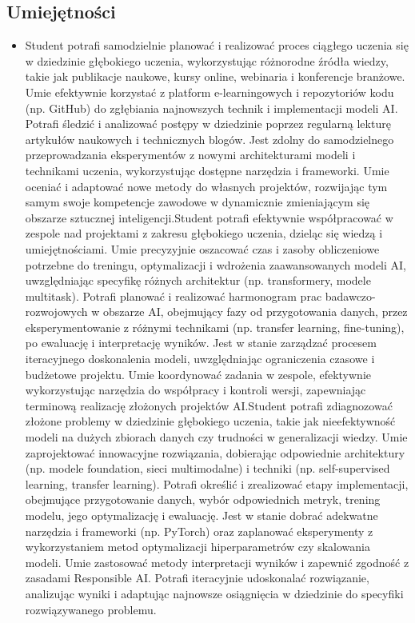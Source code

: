 \documentclass[12pt, a4paper]{article}
\begin{document}
\subsection*{Umiejętności}
\begin{itemize}
  \item Student potrafi samodzielnie planować i realizować proces ciągłego uczenia się w dziedzinie głębokiego uczenia, wykorzystując różnorodne źródła wiedzy, takie jak publikacje naukowe, kursy online, webinaria i konferencje branżowe. Umie efektywnie korzystać z platform e-learningowych i repozytoriów kodu (np. GitHub) do zgłębiania najnowszych technik i implementacji modeli AI. Potrafi śledzić i analizować postępy w dziedzinie poprzez regularną lekturę artykułów naukowych i technicznych blogów. Jest zdolny do samodzielnego przeprowadzania eksperymentów z nowymi architekturami modeli i technikami uczenia, wykorzystując dostępne narzędzia i frameworki. Umie oceniać i adaptować nowe metody do własnych projektów, rozwijając tym samym swoje kompetencje zawodowe w dynamicznie zmieniającym się obszarze sztucznej inteligencji.Student potrafi efektywnie współpracować w zespole nad projektami z zakresu głębokiego uczenia, dzieląc się wiedzą i umiejętnościami. Umie precyzyjnie oszacować czas i zasoby obliczeniowe potrzebne do treningu, optymalizacji i wdrożenia zaawansowanych modeli AI, uwzględniając specyfikę różnych architektur (np. transformery, modele multitask). Potrafi planować i realizować harmonogram prac badawczo-rozwojowych w obszarze AI, obejmujący fazy od przygotowania danych, przez eksperymentowanie z różnymi technikami (np. transfer learning, fine-tuning), po ewaluację i interpretację wyników. Jest w stanie zarządzać procesem iteracyjnego doskonalenia modeli, uwzględniając ograniczenia czasowe i budżetowe projektu. Umie koordynować zadania w zespole, efektywnie wykorzystując narzędzia do współpracy i kontroli wersji, zapewniając terminową realizację złożonych projektów AI.Student potrafi zdiagnozować złożone problemy w dziedzinie głębokiego uczenia, takie jak nieefektywność modeli na dużych zbiorach danych czy trudności w generalizacji wiedzy. Umie zaprojektować innowacyjne rozwiązania, dobierając odpowiednie architektury (np. modele foundation, sieci multimodalne) i techniki (np. self-supervised learning, transfer learning). Potrafi określić i zrealizować etapy implementacji, obejmujące przygotowanie danych, wybór odpowiednich metryk, trening modelu, jego optymalizację i ewaluację. Jest w stanie dobrać adekwatne narzędzia i frameworki (np. PyTorch) oraz zaplanować eksperymenty z wykorzystaniem metod optymalizacji hiperparametrów czy skalowania modeli. Umie zastosować metody interpretacji wyników i zapewnić zgodność z zasadami Responsible AI. Potrafi iteracyjnie udoskonalać rozwiązanie, analizując wyniki i adaptując najnowsze osiągnięcia w dziedzinie do specyfiki rozwiązywanego problemu.
\end{itemize}
\end{document}
